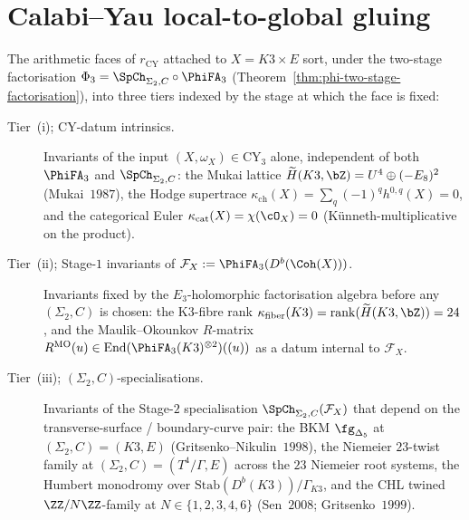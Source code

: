 
\section{Calabi--Yau local-to-global gluing}
\label{sec:cy-local-global}

\providecommand{\SerreK}{\mathbb{S}_{K3 \times E}}
\providecommand{\Borch}{\operatorname{Borch}}
\providecommand{\ThetaMO}{\Theta_{\mathrm{MO}}}
\providecommand{\ThetaHCSHall}{\Theta_{\hCS\to\Hall}^{K3\times E}}
\providecommand{\ThetaHallBorch}{\Theta_{\Hall\to\Borch}^{K3\times E}}
\providecommand{\ThetaQNCCRDT}{\Theta_{\mathrm{qNCCR}\to\mathrm{DT}}^{K3\times E}}
\providecommand{\ThetaKSE}{\Theta_{\mathrm{KS}\to E}^{K3\times E}}

\begin{remark}
\label{rem:k3e-three-tier-hierarchy}
The arithmetic faces of $r_{\mathrm{CY}}$ attached to $X = K3 \times E$ sort, under the two-stage factorisation $\Phi_3 = \SpCh_{\Sigma_2, C} \circ \PhiFA_3$ (Theorem~\ref{thm:phi-two-stage-factorisation}), into three tiers indexed by the stage at which the face is fixed:
\begin{description}
\item[Tier~(i); CY-datum intrinsics.] Invariants of the input $(X, \omega_X) \in \mathrm{CY}_3$ alone, independent of both $\PhiFA_3$ and $\SpCh_{\Sigma_2, C}$: the Mukai lattice $\widetilde{H}(K3, \bZ) = U^4 \oplus (-E_8)^2$ (Mukai~$1987$), the Hodge supertrace $\kappa_{\mathrm{ch}}(X) = \sum_q (-1)^q h^{0,q}(X) = 0$, and the categorical Euler $\kappa_{\mathrm{cat}}(X) = \chi(\cO_X) = 0$ (K\"unneth-multiplicative on the product).
\item[Tier~(ii); Stage-$1$ invariants of $\mathcal{F}_X := \PhiFA_3(D^b(\Coh(X)))$.] Invariants fixed by the $E_3$-holomorphic factorisation algebra before any $(\Sigma_2, C)$ is chosen: the K3-fibre rank $\kappa_{\mathrm{fiber}}(K3) = \operatorname{rank}(\widetilde{H}(K3, \bZ)) = 24$, and the Maulik--Okounkov $R$-matrix $R^{\mathrm{MO}}(u) \in \operatorname{End}(\PhiFA_3(K3)^{\otimes 2})((u))$ as a datum internal to $\mathcal{F}_X$.
\item[Tier~(iii); $(\Sigma_2, C)$-specialisations.] Invariants of the Stage-$2$ specialisation $\SpCh_{\Sigma_2, C}(\mathcal{F}_X)$ that depend on the transverse-surface / boundary-curve pair: the BKM $\fg_{\Delta_5}$ at $(\Sigma_2, C) = (K3, E)$ (Gritsenko--Nikulin~$1998$), the Niemeier $23$-twist family at $(\Sigma_2, C) = (T^4/\Gamma, E)$ across the $23$ Niemeier root systems, the Humbert monodromy over $\mathrm{Stab}(D^b(K3))/\Gamma_{K3}$, and the CHL twined $\ZZ/N\ZZ$-family at $N \in \{1, 2, 3, 4, 6\}$ (Sen~$2008$; Gritsenko~$1999$).

\end{description}
\end{remark}

